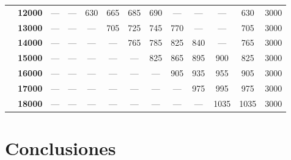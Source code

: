 \documentclass[12pt,a4paper,twoside,openright,titlepage,final]{article}
\begin{document}
\begin{table}[htbp!]
{\begin{tabular}{|ccccccccccccc|}
\multicolumn{1}{|c|}{}                                & \textbf{12000}        & ---           & ---           & 630           & 665            & 685            & 690            & ---            & ---            & ---            & 630                                                                 & 3000                                                                  \\
\multicolumn{1}{|c|}{}                                & \textbf{13000}        & ---           & ---           & ---           & 705            & 725            & 745            & 770            & ---            & ---            & 705                                                                 & 3000                                                                  \\
\multicolumn{1}{|c|}{}                                & \textbf{14000}        & ---           & ---           & ---           & ---            & 765            & 785            & 825            & 840            & ---            & 765                                                                 & 3000                                                                  \\
\multicolumn{1}{|c|}{}                                & \textbf{15000}        & ---           & ---           & ---           & ---            & ---            & 825            & 865            & 895            & 900            & 825                                                                 & 3000                                                                  \\
\multicolumn{1}{|c|}{}                                & \textbf{16000}        & ---           & ---           & ---           & ---            & ---            & ---            & 905            & 935            & 955            & 905                                                                 & 3000                                                                  \\
\multicolumn{1}{|c|}{}                                & \textbf{17000}        & ---           & ---           & ---           & ---            & ---            & ---            & ---            & 975            & 995            & 975                                                                 & 3000                                                                  \\
\multicolumn{1}{|c|}{}                                & \textbf{18000}        & ---           & ---           & ---           & ---            & ---            & ---            & ---            & ---            & 1035           & 1035                                                                & 3000                                                                  \\ \hline
\end{tabular}
}
\end{table}



\section{Conclusiones}
\end{document}
